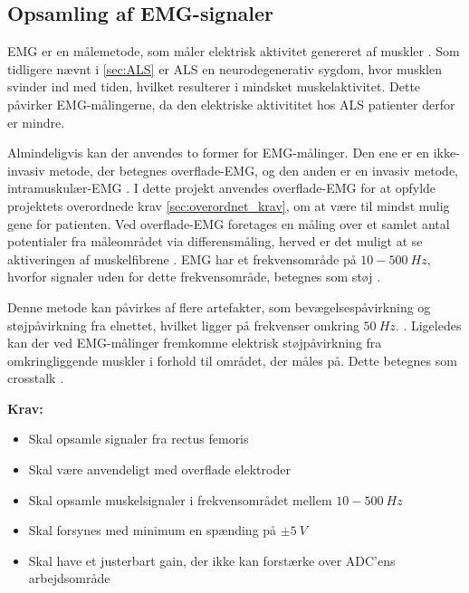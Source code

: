 \subsection{Opsamling af EMG-signaler} \label{sec:EMG_krav}
EMG er en målemetode, som måler elektrisk aktivitet genereret af muskler \citep{chowdhury2013}. 
Som tidligere nævnt i \autoref{sec:ALS} er ALS en neurodegenerativ sygdom, hvor musklen svinder ind med tiden, hvilket resulterer i mindsket muskelaktivitet. Dette påvirker EMG-målingerne, da den elektriske aktivititet hos ALS patienter derfor er mindre.

Almindeligvis kan der anvendes to former for EMG-målinger. Den ene er en ikke-invasiv metode, der betegnes overflade-EMG, og den anden er en invasiv metode, intramuskulær-EMG \citep{chowdhury2013, keenan2012}. I dette projekt anvendes overflade-EMG for at opfylde projektets overordnede krav \autoref{sec:overordnet_krav}, om at være til mindst mulig gene for patienten. Ved overflade-EMG foretages en måling over et samlet antal potentialer fra måleområdet via differensmåling, herved er det muligt at se aktiveringen af muskelfibrene \citep{keenan2012}. EMG har et frekvensområde på $10-500~Hz$, hvorfor signaler uden for dette frekvensområde, betegnes som støj \citep{morre2003, keenan2012}.  

Denne metode kan påvirkes af flere artefakter, som bevægelsespåvirkning og støjpåvirkning fra elnettet, hvilket ligger på frekvenser omkring $50~Hz$. \citep{keenan2012}.
Ligeledes kan der ved EMG-målinger fremkomme elektrisk støjpåvirkning fra omkringliggende muskler i forhold til området, der måles på. Dette betegnes som crosstalk \citep{keenan2012}. 
\vspace{3mm}

\textbf{Krav:}
\begin{itemize}
\item Skal opsamle signaler fra rectus femoris
\item Skal være anvendeligt med overflade elektroder
\item Skal opsamle muskelsignaler i frekvensområdet mellem $10-500~Hz$
\item Skal forsynes med minimum en spænding på $\pm5~V$ 
\item Skal have et justerbart gain, der ikke kan forstærke over ADC'ens arbejdsområde
\end{itemize}